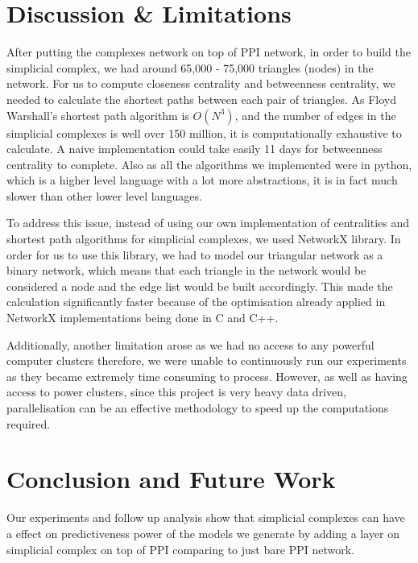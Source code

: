 \documentclass[9pt]{article}
\begin{document}
\section{Discussion \& Limitations} 
After putting the complexes network on top of PPI network, in order to build the simplicial complex, we had around 65,000 - 75,000 triangles (nodes) in the network. For us to compute closeness centrality and betweenness centrality, we needed to calculate the shortest paths between each pair of triangles. As Floyd Warshall’s shortest path algorithm is $O(N^3)$, and the number of edges in the simplicial complexes is well over 150 million, it is computationally exhaustive to calculate. A naive implementation could take easily 11 days for betweenness centrality to complete. Also as all the algorithms we implemented were in python, which is a higher level language with a lot more abstractions, it is in fact much slower than other lower level languages.

To address this issue, instead of using our own implementation of centralities and shortest path algorithms for simplicial complexes, we used NetworkX library. In order for us to use this library, we had to model our triangular network as a binary network, which means that each triangle in the network would be considered a node and the edge list would be built accordingly. This made the calculation significantly faster because of the optimisation already applied in NetworkX implementations being done in C and C++.

Additionally, another limitation arose as we had no access to any powerful computer clusters therefore, we were unable to continuously run our experiments as they became extremely time consuming to process. However, as well as having access to power clusters, since this project is very heavy data driven, parallelisation can be an effective methodology to speed up the computations required.   

\section{Conclusion and Future Work}
Our experiments and follow up analysis show that simplicial complexes can have a effect 
on predictiveness power of the models we generate by adding a layer on simplicial complex on top of PPI comparing to just bare PPI network. 
\end{document}
